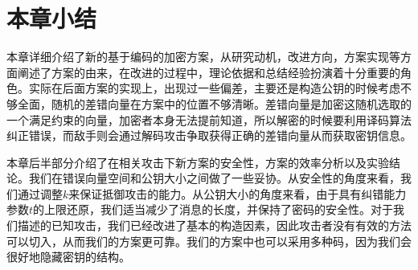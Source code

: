 \section{本章小结}
本章详细介绍了新的基于编码的加密方案，从研究动机，改进方向，方案实现等方面阐述了方案的由来，在改进的过程中，理论依据和总结经验扮演着十分重要的角色。实际在后面方案的实现上，出现过一些偏差，主要还是构造公钥的时候考虑不够全面，随机的差错向量在方案中的位置不够清晰。差错向量是加密这随机选取的一个满足约束的向量，加密者本身无法提前知道，所以解密的时候要利用译码算法纠正错误，而敌手则会通过解码攻击争取获得正确的差错向量从而获取密钥信息。

本章后半部分介绍了在相关攻击下新方案的安全性，方案的效率分析以及实验结论。我们在错误向量空间和公钥大小之间做了一些妥协。从安全性的角度来看，我们通过调整$k$来保证抵御攻击的能力。从公钥大小的角度来看，由于具有纠错能力参数$t$的上限还原，我们适当减少了消息的长度，并保持了密码的安全性。对于我们描述的已知攻击，我们已经改进了基本的构造因素，因此攻击者没有有效的方法可以切入，从而我们的方案更可靠。我们的方案中也可以采用多种码，因为我们会很好地隐藏密钥的结构。